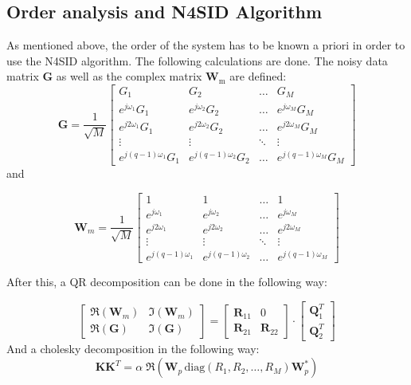 \subsection{Order analysis and N4SID Algorithm}

As mentioned above, the order of the system has to be known a priori in order to use the N4SID algorithm. The following calculations are done. The noisy data matrix $\textbf{G}$ as well as the complex matrix $\textbf{W}_\text{m}$ are defined:
\[
\textbf{G} = \frac{1}{\sqrt{M}}
\begin{bmatrix}
G_1 & G_2 & \dots & G_M \\
e^{j\omega_1}G_1 & e^{j\omega_2}G_2 & \dots & e^{j\omega_M}G_M \\
e^{j2\omega_1}G_1 & e^{j2\omega_2}G_2 & \dots & e^{j2\omega_M}G_M \\
\vdots & \vdots & \ddots & \vdots \\
e^{j(q-1)\omega_1}G_1 &e^{j(q-1)\omega_2} G_2 & \dots & e^{j(q-1)\omega_M}G_M 
\end{bmatrix} \]
and

\[
\textbf{W}_m = \frac{1}{\sqrt{M}}
\begin{bmatrix}
1 & 1 & \dots & 1 \\
e^{j\omega_1} & e^{j\omega_2} & \dots & e^{j\omega_M} \\
e^{j2\omega_1} & e^{j2\omega_2} & \dots & e^{j2\omega_M} \\
\vdots & \vdots & \ddots & \vdots \\
e^{j(q-1)\omega_1} &e^{j(q-1)\omega_2} & \dots & e^{j(q-1)\omega_M} 
\end{bmatrix}\]

After this, a QR decomposition can be done in the following way:

\[\begin{bmatrix}
\Re(\textbf{W}_m) & \Im(\textbf{W}_m) \\
\Re(\textbf{G}) & \Im(\textbf{G})
\end{bmatrix} = 
\begin{bmatrix}
\textbf{R}_{11} & 0 \\
\textbf{R}_{21} & \textbf{R}_{22}
\end{bmatrix}\cdot
\begin{bmatrix}
\textbf{Q}_1^T \\
\textbf{Q}_2^T
\end{bmatrix}
\]
And a cholesky decomposition in the following way:
\[\textbf{K}\textbf{K}^T = \alpha\;\Re(\textbf{W}_p\,\text{diag}(R_1,R_2,\dots, R_M)\textbf{W}_p^*)\]

